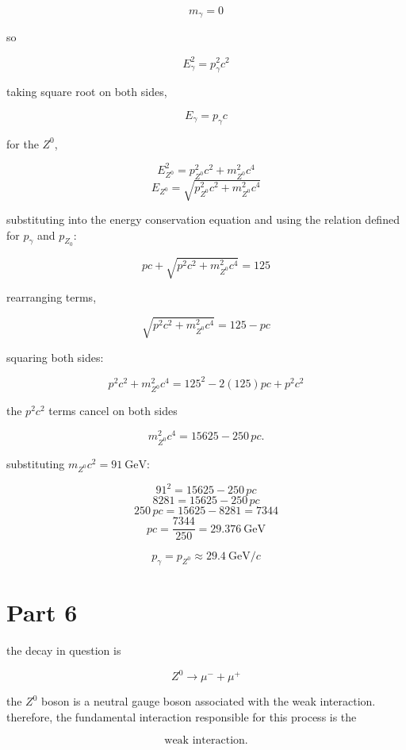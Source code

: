\documentclass{article}
\begin{document}
\[
m_{\gamma}=0
\]

so

\[
E_{\gamma}^2=p_{\gamma}^2c^2
\]

taking square root on both sides,

\[
E_{\gamma}=p_{\gamma}c
\]

for the $Z^0$,

\[
E_{Z^0}^2=p_{Z^0}^2c^2+m_{Z^0}^2c^4
\]
\[
E_{Z^0} = \sqrt{p_{Z^0}^2c^2 + m_{Z^0}^2c^4}
\]

substituting into the energy conservation equation and using the relation defined for $p_{\gamma}$ and $p_{Z_{0}}$:

\[
pc + \sqrt{p^2c^2 + m_{Z^0}^2c^4} = 125
\]

rearranging terms,

\[
\sqrt{p^2c^2 + m_{Z^0}^2c^4} = 125 - pc
\]

squaring both sides:

\[
p^2c^2 + m_{Z^0}^2c^4 = 125^2 - 2(125)pc + p^2c^2
\]

the $p^2c^2$ terms cancel on both sides

\[
m_{Z^0}^2c^4 = 15625 - 250\,pc.
\]

substituting $m_{Z^0}c^2 = 91~\mathrm{GeV}$:

\[
91^2 = 15625 - 250\,pc
\]
\[
8281 = 15625 - 250\,pc
\]
\[
250\,pc = 15625 - 8281 = 7344
\]
\[
pc = \frac{7344}{250} = 29.376~\mathrm{GeV}
\]

\[
\boxed{p_\gamma = p_{Z^0} \approx 29.4~\mathrm{GeV}/c}
\]

\section{Part 6}

the decay in question is

\[
Z^0\rightarrow\mu^-+\mu^+
\]

the $Z^0$ boson is a neutral gauge boson associated with the weak interaction. therefore, the 
fundamental interaction responsible for this process is the

\[
\boxed{\text{weak interaction}}.
\]
\end{document}
